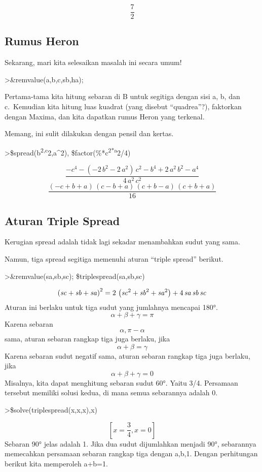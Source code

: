 \documentclass[
]{book}
\begin{document}
\[\frac{7}{2}\]

\subsection{Rumus Heron}

Sekarang, mari kita selesaikan masalah ini secara umum!

\textgreater\&remvalue(a,b,c,sb,ha);

Pertama-tama kita hitung sebaran di B untuk segitiga dengan sisi a, b, dan c.~Kemudian kita hitung luas kuadrat (yang disebut ``quadrea''?), faktorkan dengan Maxima, dan kita dapatkan rumus Heron yang terkenal.

Memang, ini sulit dilakukan dengan pensil dan kertas.

\textgreater\$spread(b\textsuperscript{2,c}2,a\^{}2), \$factor(\%*c\textsuperscript{2*a}2/4)

\[\frac{-c^4-\left(-2\,b^2-2\,a^2\right)\,c^2-b^4+2\,a^2\,b^2-a^4}{4\,a^2\,c^2}\] \[\frac{\left(-c+b+a\right)\,\left(c-b+a\right)\,\left(c+b-a\right)\,\left(c+b+a\right)}{16}\] 

\subsection{Aturan Triple Spread}

Kerugian spread adalah tidak lagi sekadar menambahkan sudut yang sama.

Namun, tiga spread segitiga memenuhi aturan ``triple spread'' berikut.

\textgreater\&remvalue(sa,sb,sc); \$triplespread(sa,sb,sc)

\[\left({\it sc}+{\it sb}+{\it sa}\right)^2=2\,\left({\it sc}^2+ {\it sb}^2+{\it sa}^2\right)+4\,{\it sa}\,{\it sb}\,{\it sc}\]Aturan ini berlaku untuk tiga sudut yang jumlahnya mencapai 180°. \[\alpha+\beta+\gamma=\pi\]Karena sebaran \[\alpha, \pi-\alpha\]sama, aturan sebaran rangkap tiga juga berlaku, jika \[\alpha+\beta=\gamma\]Karena sebaran sudut negatif sama, aturan sebaran rangkap tiga juga berlaku, jika \[\alpha+\beta+\gamma=0\]Misalnya, kita dapat menghitung sebaran sudut 60°. Yaitu 3/4. Persamaan tersebut memiliki solusi kedua, di mana semua sebarannya adalah 0.

\textgreater\$solve(triplespread(x,x,x),x)

\[\left[ x=\frac{3}{4} , x=0 \right]\]Sebaran 90° jelas adalah 1. Jika dua sudut dijumlahkan menjadi 90°, sebarannya memecahkan persamaan sebaran rangkap tiga dengan a,b,1. Dengan perhitungan berikut kita memperoleh a+b=1.
\end{document}
